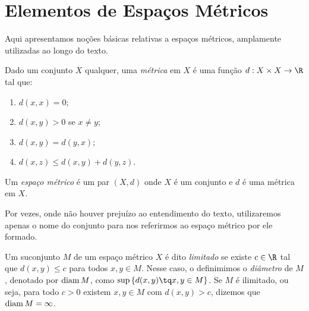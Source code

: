\section{Elementos de Espaços Métricos}

Aqui apresentamos noções básicas relativas a espaços métricos, amplamente utilizadas ao longo do texto.

\begin{defn}
    Dado um conjunto \( X \) qualquer, uma \emph{métrica} em \( X \) é uma função \( d : X \times X \to \R \) tal que:
    \begin{enumerate}[label=\roman*)]
        \item \( d(x, x) = 0 \);
        \item \( d(x, y) > 0 \) se \( x \neq y \);
        \item \( d(x, y) = d(y, x) \);
        \item \( d(x, z) \leq d(x, y) + d(y, z) \).
    \end{enumerate}
\end{defn}


\begin{defn}
    Um \emph{espaço métrico} é um par \( ( X, d ) \) onde \( X \) é um conjunto e \( d \) é uma métrica em \( X \).
\end{defn}

    Por vezes, onde não houver prejuízo ao entendimento do texto, utilizaremos apenas o nome do conjunto para nos referirmos ao espaço métrico por ele formado.

\begin{defn}
    Um suconjunto \( M \) de um espaço métrico \( X \) é dito \emph{limitado} se existe \( c \in \R \) tal que \( d(x, y) \leq c \) para todos \( x, y \in M \).
    Nesse caso, o definimimos o \emph{diâmetro} de \( M \), denotado por \( \operatorname{diam} M \), como \( \sup \left\{ d(x, y) \tq x, y \in M \right\} \).
    Se \( M \) é ilimitado, ou seja, para todo \( c > 0 \) existem \( x, y \in M \) com \( d(x, y) > c \), dizemos que \( \operatorname{diam} M = \infty \).
\end{defn}


